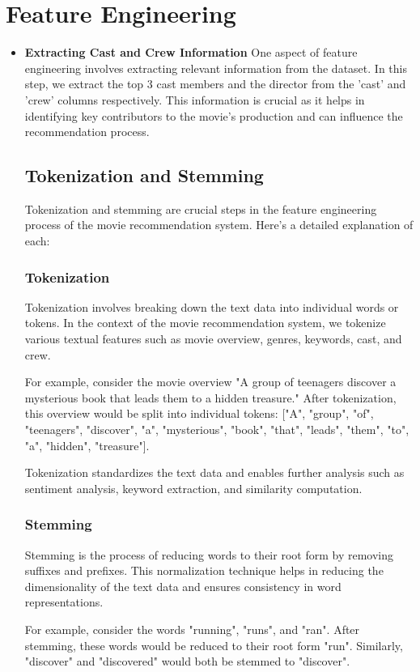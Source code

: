 \documentclass{article}
\begin{document}
\section{Feature Engineering}
\begin{itemize}
    \item \textbf{Extracting Cast and Crew Information}
One aspect of feature engineering involves extracting relevant information from the dataset. In this step, we extract the top 3 cast members and the director from the 'cast' and 'crew' columns respectively. This information is crucial as it helps in identifying key contributors to the movie's production and can influence the recommendation process.
\subsection{Tokenization and Stemming}
Tokenization and stemming are crucial steps in the feature engineering process of the movie recommendation system. Here's a detailed explanation of each:

\subsubsection{Tokenization}
Tokenization involves breaking down the text data into individual words or tokens. In the context of the movie recommendation system, we tokenize various textual features such as movie overview, genres, keywords, cast, and crew. 

For example, consider the movie overview "A group of teenagers discover a mysterious book that leads them to a hidden treasure." After tokenization, this overview would be split into individual tokens: ["A", "group", "of", "teenagers", "discover", "a", "mysterious", "book", "that", "leads", "them", "to", "a", "hidden", "treasure"]. 

Tokenization standardizes the text data and enables further analysis such as sentiment analysis, keyword extraction, and similarity computation.

\subsubsection{Stemming}
Stemming is the process of reducing words to their root form by removing suffixes and prefixes. This normalization technique helps in reducing the dimensionality of the text data and ensures consistency in word representations.

For example, consider the words "running", "runs", and "ran". After stemming, these words would be reduced to their root form "run". Similarly, "discover" and "discovered" would both be stemmed to "discover".


\end{itemize}
\end{document}
